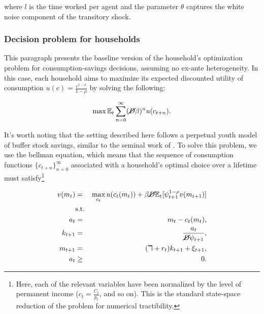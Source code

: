 \par where $l$ is the time worked per agent and the parameter $\theta$ captures the white noise component of the transitory shock.


\subsubsection{Decision problem for households}

\par This paragraph presents the baseline version of the household's optimization problem for consumption-savings decisions, assuming no ex-ante heterogeneity. In this case, each household aims to maximize its expected discounted utility of consumption $u(c) = \frac{c^{1-\rho}}{1-\rho}$ by solving the following:

$$ \max \mathbb{E}_t \sum_{n=0}^{\infty}(\cancel{D}\beta)^{n} u(c_{t+n}). $$

\par It's worth noting that the setting described here follows a perpetual youth model of buffer stock savings, similar to the seminal work of \cite{ks1998}. To solve this problem, we use the bellman equation, which means that the sequence of consumption functions $\{c_{t+n}\}^{\infty}_{n=0}$ associated with a household's optimal choice over a lifetime must satisfy\footnote{Here, each of the relevant variables have been normalized by the level of permanent income ($c_t = \frac{C_t}{p_t}$, and so on). This is the standard state-space reduction of the problem for numerical tractibility.} 

\begin{eqnarray*}
  v(m_t) &=& \max_{c_t} u(c_t(m_t)) + \beta \cancel{D} \mathbb{E}_{t}[\psi_{t+1}^{1-\rho}v(m_{t+1})] \\
  &\text{s.t.}& \\
  a_t &=& m_t - c_t(m_t), \\
  k_{t+1} &=& \frac{a_t}{\cancel{D}\psi_{t+1}}, \\
  m_{t+1} &=& (\daleth + r_t)k_{t+1} + \xi_{t+1}, \\
  a_t &\geq& 0.
\end{eqnarray*}





